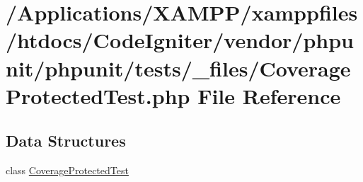 \hypertarget{phpunit_2tests_2__files_2_coverage_protected_test_8php}{}\section{/\+Applications/\+X\+A\+M\+P\+P/xamppfiles/htdocs/\+Code\+Igniter/vendor/phpunit/phpunit/tests/\+\_\+files/\+Coverage\+Protected\+Test.php File Reference}
\label{phpunit_2tests_2__files_2_coverage_protected_test_8php}
\subsection*{Data Structures}
\begin{DoxyCompactItemize}
\item 
class \mbox{\hyperlink{class_coverage_protected_test}{Coverage\+Protected\+Test}}
\end{DoxyCompactItemize}
